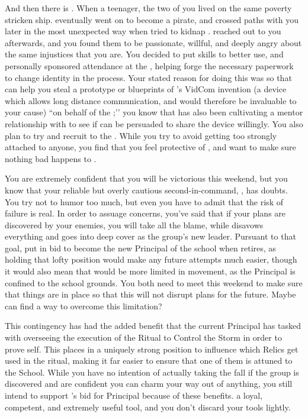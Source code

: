 \documentclass[char]{GL2020}
\begin{document}
And then there is \cPirateChild{}. When \cPirateChild{\they} \cPirateChild{\were} a teenager, the two of you lived on the same poverty stricken ship. \cPirateChild{} eventually went on to become a pirate, and crossed paths with you later in the most unexpected way when \cPirateChild{\they} tried to kidnap \cHeadDiplomat{}. \cPirateChild{\They} reached out to you afterwards, and you found them to be passionate, willful, and deeply angry about the same injustices that you are. You decided to put \cPirateChild{\their} skills to better use, and personally sponsored \cPirateChild{\their} attendance at the \pSchool{}, helping \cPirateChild{\them} forge the necessary paperwork to change \cPirateChild{\their} identity in the process. Your stated reason for doing this was so that \cPirateChild{\they} can help you steal a prototype or blueprints of \cTechStar{\full}’s VidCom invention (a device which allows long distance communication, and would therefore be invaluable to your cause) ``on behalf of the \pShip{};’’ you know that \cChupInventor{} has also been cultivating a mentor relationship with \cTechStar{} to see if \cTechStar{\they} can be persuaded to share the device willingly. You also plan to try and recruit \cPirateChild{} to the \pGoaties{}. While you try to avoid getting too strongly attached to anyone, you find that you feel protective of \cPirateChild{\them}, and want to make sure nothing bad happens to \cPirateChild{\them}. 

You are extremely confident that you will be victorious this weekend, but you know that your reliable but overly cautious second-in-command, \cChupSecond{}, has doubts. You try not to humor \cChupSecond{\them} too much, but even you have to admit that the risk of failure is real. In order to assuage \cChupSecond{\their} concerns, you've said that if your plans are discovered by your enemies, you will take all the blame, while \cChupSecond{} disavows everything and goes into deep cover as the group's new leader. Pursuant to that goal, \cChupSecond{\they} put in \cChupSecond{\their} bid to become the new Principal of the school when \cPrincipal{\full} retires, as holding that lofty position would make any future attempts much easier, though it would also mean that \cChupSecond{} would be more limited in movement, as the Principal is confined to the school grounds. You both need to meet this weekend to make sure that things are in place so that this will not disrupt plans for the future. Maybe \cGenesis{} can find a way to overcome this limitation?

This contingency has had the added benefit that the current Principal has tasked \cChupSecond{} with overseeing the execution of the Ritual to Control the Storm in order to prove \cChupSecond{\them}self. This places \cChupSecond{\them} in a uniquely strong position to influence which Relics get used in the ritual, making it far easier to ensure that one of them is attuned to the School. While you have no intention of actually taking the fall if the group is discovered and are confident you can charm your way out of anything, you still intend to support \cChupSecond{}’s bid for Principal because of these benefits. \cChupSecond{\They} \cChupSecond{\are} a loyal, competent, and extremely useful tool, and you don’t discard your tools lightly.
\end{document}
